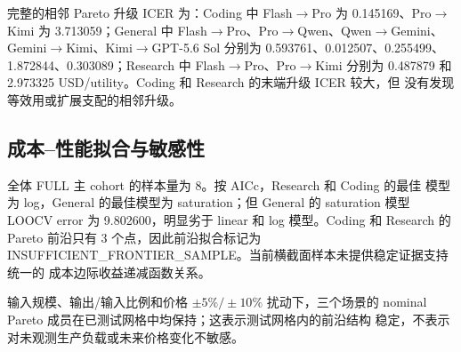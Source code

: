 完整的相邻 Pareto 升级 ICER 为：Coding 中 Flash$\rightarrow$Pro 为
0.145169、Pro$\rightarrow$Kimi 为 3.713059；General 中
Flash$\rightarrow$Pro、Pro$\rightarrow$Qwen、Qwen$\rightarrow$Gemini、
Gemini$\rightarrow$Kimi、Kimi$\rightarrow$GPT-5.6 Sol 分别为
0.593761、0.012507、0.255499、1.872844、0.303089；Research 中
Flash$\rightarrow$Pro、Pro$\rightarrow$Kimi 分别为 0.487879 和
2.973325 USD/utility。Coding 和 Research 的末端升级 ICER 较大，但
没有发现等效用或扩展支配的相邻升级。

\subsection{成本--性能拟合与敏感性}

全体 FULL 主 cohort 的样本量为 8。按 AICc，Research 和 Coding 的最佳
模型为 log，General 的最佳模型为 saturation；但 General 的 saturation
模型 LOOCV error 为 9.802600，明显劣于 linear 和 log 模型。Coding 和
Research 的 Pareto 前沿只有 3 个点，因此前沿拟合标记为
INSUFFICIENT\_FRONTIER\_SAMPLE。当前横截面样本未提供稳定证据支持统一的
成本边际收益递减函数关系。

输入规模、输出/输入比例和价格 $\pm5\%/\pm10\%$ 扰动下，三个场景的
nominal Pareto 成员在已测试网格中均保持；这表示测试网格内的前沿结构
稳定，不表示对未观测生产负载或未来价格变化不敏感。
